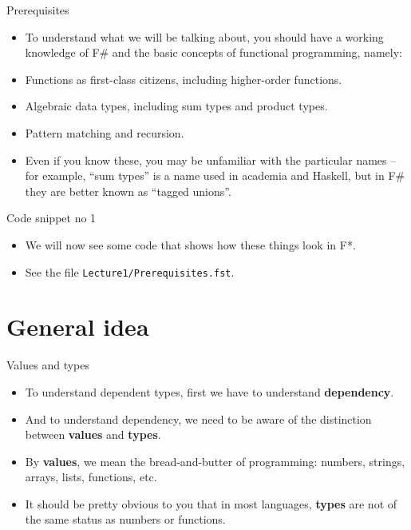 \documentclass{beamer}
\begin{document}
\begin{frame}{Prerequisites}
\begin{itemize}
	\item To understand what we will be talking about, you should have a working knowledge of F\# and the basic concepts of functional programming, namely:
	\item Functions as first-class citizens, including higher-order functions.
	\item Algebraic data types, including sum types and product types.
	\item Pattern matching and recursion.
	\item Even if you know these, you may be unfamiliar with the particular names -- for example, ``sum types'' is a name used in academia and Haskell, but in F\# they are better known as ``tagged unions''.
\end{itemize}
\end{frame}

\begin{frame}{Code snippet no 1}
\begin{itemize}
	\item We will now see some code that shows how these things look in F*.
	\item See the file \texttt{Lecture1/Prerequisites.fst}.
\end{itemize}
\end{frame}

\section{General idea}

\begin{frame}{Values and types}
\begin{itemize}
	\item To understand dependent types, first we have to understand \textbf{dependency}.
	\item And to understand dependency, we need to be aware of the distinction between \textbf{values} and \textbf{types}.
	\item By \textbf{values}, we mean the bread-and-butter of programming: numbers, strings, arrays, lists, functions, etc.
	\item It should be pretty obvious to you that in most languages, \textbf{types} are not of the same status as numbers or functions.
\end{itemize}
\end{frame}
\end{document}
